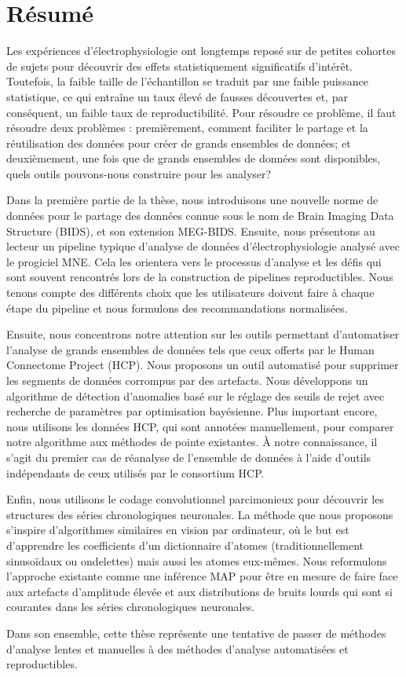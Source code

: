 \chapter*{Résumé}

Les expériences d’électrophysiologie ont longtemps reposé sur de petites cohortes de sujets pour découvrir des effets statistiquement significatifs d’intérêt. Toutefois, la faible taille de l’échantillon se traduit par une faible puissance statistique, ce qui entraîne un taux élevé de fausses découvertes et, par conséquent, un faible taux de reproductibilité. Pour résoudre ce problème, il faut résoudre deux problèmes : premièrement, comment faciliter le partage et la réutilisation des données pour créer de grands ensembles de données; et deuxièmement, une fois que de grands ensembles de données sont disponibles, quels outils pouvons-nous construire pour les analyser?

Dans la première partie de la thèse, nous introduisons une nouvelle norme de données pour le partage des données connue sous le nom de Brain Imaging Data Structure (BIDS), et son extension MEG-BIDS. Ensuite, nous présentons au lecteur un pipeline typique d’analyse de données d’électrophysiologie analysé avec le progiciel MNE. Cela les orientera vers le processus d’analyse et les défis qui sont souvent rencontrés lors de la construction de pipelines reproductibles. Nous tenons compte des différents choix que les utilisateurs doivent faire à chaque étape du pipeline et nous formulons des recommandations normalisées.

Ensuite, nous concentrons notre attention sur les outils permettant d’automatiser l’analyse de grands ensembles de données tels que ceux offerts par le Human Connectome Project (HCP). Nous proposons un outil automatisé pour supprimer les segments de données corrompus par des artefacts. Nous développons un algorithme de détection d’anomalies basé sur le réglage des seuils de rejet avec recherche de paramètres par optimisation bayésienne. Plus important encore, nous utilisons les données HCP, qui sont annotées manuellement, pour comparer notre algorithme aux méthodes de pointe existantes. À notre connaissance, il s’agit du premier cas de réanalyse de l’ensemble de données à l’aide d’outils indépendants de ceux utilisés par le consortium HCP.

Enfin, nous utilisons le codage convolutionnel parcimonieux pour découvrir les structures des séries chronologiques neuronales. La méthode que nous proposons s’inspire d’algorithmes similaires en vision par ordinateur, où le but est d’apprendre les coefficients d’un dictionnaire d’atomes (traditionnellement sinusoïdaux ou ondelettes) mais aussi les atomes eux-mêmes. Nous reformulons l’approche existante comme une inférence MAP pour être en mesure de faire face aux artefacts d’amplitude élevée et aux distributions de bruits lourds qui sont si courantes dans les séries chronologiques neuronales.

Dans son ensemble, cette thèse représente une tentative de passer de méthodes d’analyse lentes et manuelles à des méthodes d’analyse automatisées et reproductibles.
